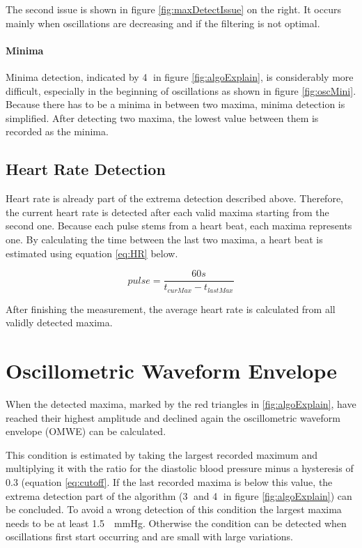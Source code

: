The second issue is shown in figure \ref{fig:maxDetectIssue} on the right. It occurs mainly when oscillations are decreasing and if the filtering is not optimal. 
\paragraph{Minima} Minima detection, indicated by \textcircled{4} in figure \ref{fig:algoExplain}, is considerably more difficult, especially in the beginning of oscillations as shown in figure \ref{fig:oscMini}. Because there has to be a minima in between two maxima, minima detection is simplified. After detecting two maxima, the lowest value between them is recorded as the minima.


\subsection{Heart Rate Detection}\label{sec:HR}
Heart rate is already part of the extrema detection described above. Therefore, the current heart rate is detected after each valid maxima starting from the second one. Because each pulse stems from a heart beat, each maxima represents one. By calculating the time between the last two maxima, a heart beat is estimated using equation \ref{eq:HR} below.

\begin{equation}
\label{eq:HR}
pulse=\frac{60s}{t_{curMax} - t_{lastMax}}
\end{equation}

After finishing the measurement, the average heart rate is calculated from all validly detected maxima.


\section{Oscillometric Waveform Envelope}
When the detected maxima, marked by the red triangles in \ref{fig:algoExplain}, have reached their highest amplitude and declined again the oscillometric waveform envelope (OMWE) can be calculated. 

This condition is estimated by taking the largest recorded maximum and multiplying it with the ratio for the diastolic blood pressure minus a hysteresis of $0.3$ (equation \ref{eq:cutoff}. If the last recorded maxima is below this value, the extrema detection part of the algorithm (\textcircled{3} and \textcircled{4} in figure \ref{fig:algoExplain}) can be concluded. To avoid a wrong detection of this condition the largest maxima needs to be at least \SI{1.5}{\delta\mmHg}. Otherwise the condition can be detected when oscillations first start occurring and are small with large variations. 

